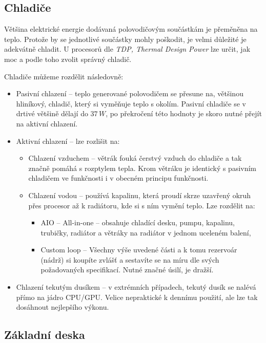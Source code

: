 \documentclass[a4paper]{article}
\begin{document}
    \subsection{Chladiče}
        Většina elektrické energie dodávaná polovodičovým součástkám je přeměněna na teplo. Protože by se jednotlivé součástky mohly poškodit, je velmi důležité je adekvátně chladit. U procesorů dle \textit{TDP, Thermal Design Power} lze určit, jak moc  a podle toho zvolit správný chladič. \par
        Chladiče můžeme rozdělit následovně:
        \begin{itemize}
            \item Pasivní chlazení -- teplo generované polovodičem se přesune na, většinou hliníkový, chladič, který si vyměňuje teplo s okolím. Pasivní chladiče se v drtivé většině dělají do $37\,W$, po překročení této hodnoty je skoro nutné přejít na aktivní chlazení.
            \item Aktivní chlazení -- lze rozlišit na:
            \begin{itemize}
                \item Chlazení vzduchem -- větrák fouká čerstvý vzduch do chladiče a tak značně pomáhá s rozptylem tepla. Krom větráku je identický s pasivním chladičem ve funkčnosti i v obecném principu funkčnosti.
                \item Chlazení vodou -- používá kapalinu, která proudí skrze uzavřený okruh přes procesor až k radiátoru, kde si s ním vymění teplo. Lze rozdělit na:
                \begin{itemize}
                    \item AIO -- All-in-one -- obsahuje chladící desku, pumpu, kapalinu, trubičky, radiátor a větráky na radiátor v jednom uceleném balení, 
                    \item Custom loop -- Všechny výše uvedené části a k tomu rezervoár (nádrž) si koupíte zvlášť a sestavíte se na míru dle svých požadovaných specifikací. Nutné značné úsilí, je dražší.
                \end{itemize}
            \end{itemize}
            \item Chlazení tekutým dusíkem -- v extrémních případech, tekutý dusík se nalévá přímo na jádro CPU/GPU. Velice nepraktické k dennímu použití, ale lze tak dosáhnout nejlepšího výkonu.
        \end{itemize}
    \subsection{Základní deska}
\end{document}
